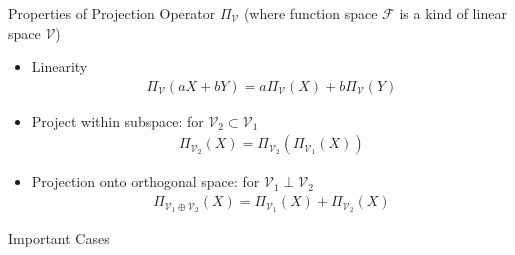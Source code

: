 \begin{point}
    Properties of Projection Operator $ \Pi_{\mathcal{V}} $ (where function space $ \mathscr{F} $ is a kind of linear space $ \mathcal{V} $)
\end{point}
\begin{itemize}[topsep=2pt,itemsep=0pt]
    \item Linearity
    \begin{align}
        \Pi_{\mathcal{V}}(aX+bY)=a\Pi_{\mathcal{V}}(X)+b\Pi_{\mathcal{V}}(Y)
    \end{align}
    \item Project within subspace: for $\mathcal{V}_2\subset \mathcal{V}_1 $
    \begin{align}
        \Pi_{\mathcal{V}_2}(X)=\Pi_{\mathcal{V}_2}\left(\Pi_{\mathcal{V}_1}(X)\right) 
    \end{align}
    \item Projection onto orthogonal space: for $ \mathcal{V}_1\perp\mathcal{V}_2 $
    \begin{align}
        \Pi_{\mathcal{V}_1\oplus\mathcal{V}_2}(X)=\Pi_{\mathcal{V}_1}(X)+\Pi_{\mathcal{V}_2}(X) 
    \end{align}
\end{itemize}

\begin{point}
    Important Cases
\end{point}

